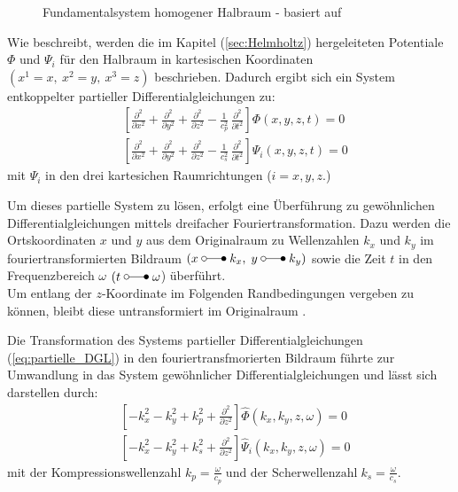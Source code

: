\begin{figure}[H]
	\hspace*{45mm}
	
	\caption{Fundamentalsystem homogener Halbraum - basiert auf \citep{Freisinger2022}}
	\label{fig:cha09_hs}
\end{figure}
Wie \cite{Fruehe2010} beschreibt, werden die im Kapitel (\ref{sec:Helmholtz}) hergeleiteten Potentiale $\Phi$ und $\Psi_{i}$ für den Halbraum in kartesischen Koordinaten \((x^1 = x,\ x^2 = y,\ x^3 = z)\) beschrieben. Dadurch ergibt sich ein System entkoppelter partieller Differentialgleichungen zu:
\begin{subequations}\label{eq:partielle_DGL}
		\begin{align}
			&\left[\frac{\partial^{2}}{\partial x^{2}}
			+ \frac{\partial^{2}}{\partial y^{2}}
			+ \frac{\partial^{2}}{\partial z^{2}}
			- \frac{1}{c_p^{2}}\,\frac{\partial^{2}}{\partial t^{2}}\right]
			\Phi(x,y,z,t) = 0
			\label{eq:phi_wave} \\[6pt]
			&\left[\frac{\partial^{2}}{\partial x^{2}}
			+ \frac{\partial^{2}}{\partial y^{2}}
			+ \frac{\partial^{2}}{\partial z^{2}}
			- \frac{1}{c_s^{2}}\,\frac{\partial^{2}}{\partial t^{2}}\right]
			\Psi_{i}(x,y,z,t) = 0
			\label{eq:psi_wave}
		\end{align}
\end{subequations}
mit $\Psi_{i}$ in den drei kartesichen Raumrichtungen (\( i = x, y, z.\))

\newcommand{\mapto}{\mathrel{\laplace}}
Um dieses partielle System zu lösen, erfolgt eine Überführung zu gewöhnlichen Differentialgleichungen mittels dreifacher Fouriertransformation. 
Dazu werden die Ortskoordinaten $x$ und $y$ aus dem Originalraum zu Wellenzahlen \(k_x\) und \(k_y\) im fouriertransformierten Bildraum \((x \mapto k_x,\; y \mapto k_y)\) sowie die Zeit $t$ in den Frequenzbereich $\omega$ \((t \mapto \omega\)) überführt.\\
Um entlang der $z$-Koordinate  im Folgenden Randbedingungen vergeben zu können, bleibt diese untransformiert im Originalraum \citep{Mueller2007}.

Die Transformation des Systems partieller Differentialgleichungen (\ref{eq:partielle_DGL}) in den fouriertransfmorierten Bildraum führte zur Umwandlung in das System gewöhnlicher Differentialgleichungen und lässt sich darstellen durch:
\begin{subequations}\label{eq:gewöhnliche_DGL}
	{	\begin{align}
			&\left[-k_x^{2}-k_y^{2}+k_p^{2}+\frac{\partial^{2}}{\partial z^{2}}\right]
			\hat{\Phi}(k_x,k_y,z,\omega) = 0 \label{eq:phi_helmholtz}\\[6pt]
			&\left[-k_x^{2}-k_y^{2}+k_s^{2}+\frac{\partial^{2}}{\partial z^{2}}\right]
			\hat{\Psi}_{i}(k_x,k_y,z,\omega) = 0 \label{eq:psi_helmholtz}
		\end{align}
	}
\end{subequations}
mit der Kompressionswellenzahl \( k_p = \frac{\omega}{c_p} \;\text{und der Scherwellenzahl}\; k_s = \frac{\omega}{c_s} \).

